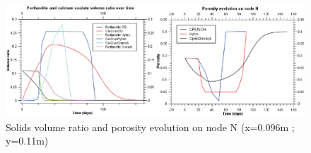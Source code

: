 \begin{figure}[!htb]
  \begin{center}
  \includegraphics[scale=0.4]{PART_III/HC/comedy_porosity.eps}
  \end{center}
  \caption{Solids volume ratio and porosity evolution on node N (x=0.096m ; y=0.11m)}
  \label{hc:comedy_clogging}
\end{figure}




